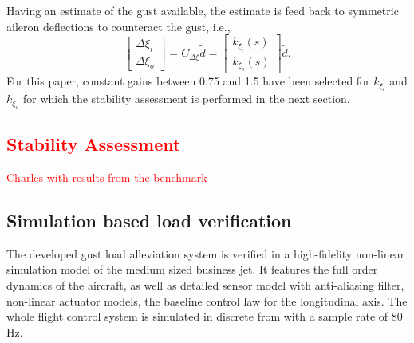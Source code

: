 \documentclass[graybox]{svmult}
\begin{document}
Having an estimate of the gust available, the estimate is feed back to symmetric aileron deflections to counteract the gust, i.e., 
\begin{equation}	
	\begin{bmatrix}
		\Delta \xi_i \\ \Delta \xi_o 
	\end{bmatrix} = 
 	C_{\Delta\xi}
	\tilde d 
	=
	\begin{bmatrix}
		k_{\xi_i}(s) \\ k_{\xi_o}(s) 
	\end{bmatrix}
	\tilde d.
\end{equation}
For this paper, constant gains between 0.75 and 1.5 have been selected for $k_{\xi_i}$ and $k_{\xi_o}$ for which the stability assessment is performed in the next section.




\textcolor{red}{
\subsection{Stability Assessment}\label{APPsubsec:stab}
Charles with results from the benchmark
}

\subsection{Simulation based load verification}\label{APPsubsec:sim}
The developed gust load alleviation system is verified in a high-fidelity non-linear simulation model of the medium sized business jet. It features the full order dynamics of the aircraft, as well as detailed sensor model with anti-aliasing filter, non-linear actuator models, the baseline control law for the longitudinal axis. The whole flight control system is simulated in discrete from with a sample rate of 80\,Hz.
\end{document}
